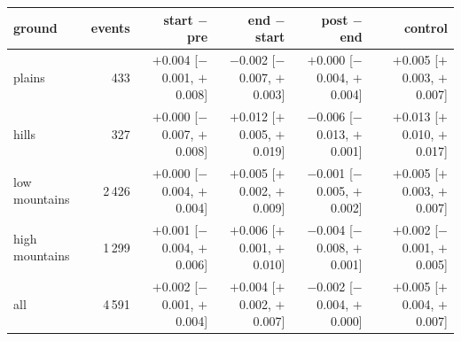 \begin{tabular}{@{}l r r r r r@{}}
\toprule
ground & events & start $-$ pre & end $-$ start & post $-$ end & control \\
\midrule
plains & 433 & $+$0.004 [$-$0.001, $+$0.008] & $-$0.002 [$-$0.007, $+$0.003] & $+$0.000 [$-$0.004, $+$0.004] & $+$0.005 [$+$0.003, $+$0.007] \\
hills & 327 & $+$0.000 [$-$0.007, $+$0.008] & $+$0.012 [$+$0.005, $+$0.019] & $-$0.006 [$-$0.013, $+$0.001] & $+$0.013 [$+$0.010, $+$0.017] \\
low mountains & 2\,426 & $+$0.000 [$-$0.004, $+$0.004] & $+$0.005 [$+$0.002, $+$0.009] & $-$0.001 [$-$0.005, $+$0.002] & $+$0.005 [$+$0.003, $+$0.007] \\
high mountains & 1\,299 & $+$0.001 [$-$0.004, $+$0.006] & $+$0.006 [$+$0.001, $+$0.010] & $-$0.004 [$-$0.008, $+$0.001] & $+$0.002 [$-$0.001, $+$0.005] \\
all & 4\,591 & $+$0.002 [$-$0.001, $+$0.004] & $+$0.004 [$+$0.002, $+$0.007] & $-$0.002 [$-$0.004, $+$0.000] & $+$0.005 [$+$0.004, $+$0.007] \\
\bottomrule
\end{tabular}
